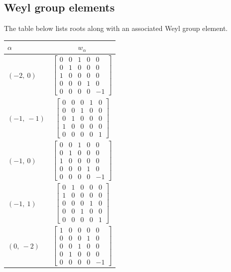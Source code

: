 \documentclass[11pt]{article}
\newcommand{\noi}{\noindent}
\theoremstyle{definition}
\begin{document}
\subsection{Weyl group elements}

\noi The table below lists roots along with an associated Weyl group element.

\bigskip

\noi \noindent \begin{longtable}{|l|c|}
    \hline
    $\alpha$ & $w_\alpha$ \\
    \hline
    \endhead
    $\left( -2, \  0\right)$ & ${\left[\begin{matrix}0 & 0 & 1 & 0 & 0\\0 & 1 & 0 & 0 & 0\\1 & 0 & 0 & 0 & 0\\0 & 0 & 0 & 1 & 0\\0 & 0 & 0 & 0 & -1\end{matrix}\right]}$ \\
    \hline
    $\left( -1, \  -1\right)$ & ${\left[\begin{matrix}0 & 0 & 0 & 1 & 0\\0 & 0 & 1 & 0 & 0\\0 & 1 & 0 & 0 & 0\\1 & 0 & 0 & 0 & 0\\0 & 0 & 0 & 0 & 1\end{matrix}\right]}$ \\
    \hline
    $\left( -1, \  0\right)$ & ${\left[\begin{matrix}0 & 0 & 1 & 0 & 0\\0 & 1 & 0 & 0 & 0\\1 & 0 & 0 & 0 & 0\\0 & 0 & 0 & 1 & 0\\0 & 0 & 0 & 0 & -1\end{matrix}\right]}$ \\
    \hline
    $\left( -1, \  1\right)$ & ${\left[\begin{matrix}0 & 1 & 0 & 0 & 0\\1 & 0 & 0 & 0 & 0\\0 & 0 & 0 & 1 & 0\\0 & 0 & 1 & 0 & 0\\0 & 0 & 0 & 0 & 1\end{matrix}\right]}$ \\
    \hline
    $\left( 0, \  -2\right)$ & ${\left[\begin{matrix}1 & 0 & 0 & 0 & 0\\0 & 0 & 0 & 1 & 0\\0 & 0 & 1 & 0 & 0\\0 & 1 & 0 & 0 & 0\\0 & 0 & 0 & 0 & -1\end{matrix}\right]}$ \\

\end{longtable}
\end{document}
